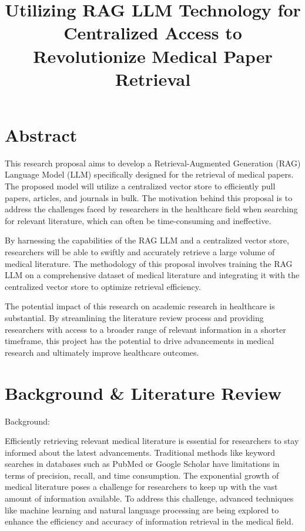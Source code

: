 \documentclass{article}
\begin{document}
\title{Utilizing RAG LLM Technology for Centralized Access to Revolutionize Medical Paper Retrieval}
\date{}
\maketitle

\section*{Abstract}
This research proposal aims to develop a Retrieval-Augmented Generation (RAG) Language Model (LLM) specifically designed for the retrieval of medical papers. The proposed model will utilize a centralized vector store to efficiently pull papers, articles, and journals in bulk. The motivation behind this proposal is to address the challenges faced by researchers in the healthcare field when searching for relevant literature, which can often be time-consuming and ineffective.

By harnessing the capabilities of the RAG LLM and a centralized vector store, researchers will be able to swiftly and accurately retrieve a large volume of medical literature. The methodology of this proposal involves training the RAG LLM on a comprehensive dataset of medical literature and integrating it with the centralized vector store to optimize retrieval efficiency.

The potential impact of this research on academic research in healthcare is substantial. By streamlining the literature review process and providing researchers with access to a broader range of relevant information in a shorter timeframe, this project has the potential to drive advancements in medical research and ultimately improve healthcare outcomes.

\section*{Background \& Literature Review}
Background:

Efficiently retrieving relevant medical literature is essential for researchers to stay informed about the latest advancements. Traditional methods like keyword searches in databases such as PubMed or Google Scholar have limitations in terms of precision, recall, and time consumption. The exponential growth of medical literature poses a challenge for researchers to keep up with the vast amount of information available. To address this challenge, advanced techniques like machine learning and natural language processing are being explored to enhance the efficiency and accuracy of information retrieval in the medical field.
\end{document}
